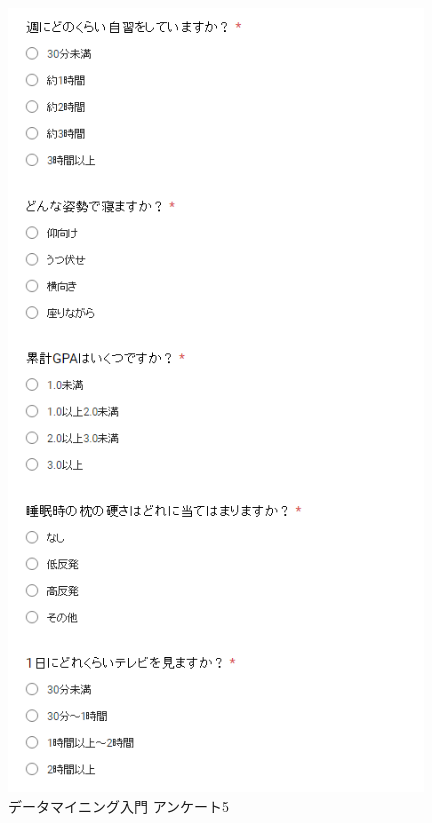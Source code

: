 \begin{figure}[p]
\centering
\includegraphics[width=11cm]{forms5.PNG}
\caption{データマイニング入門 アンケート5}\label{サンプル図}
\end{figure}

